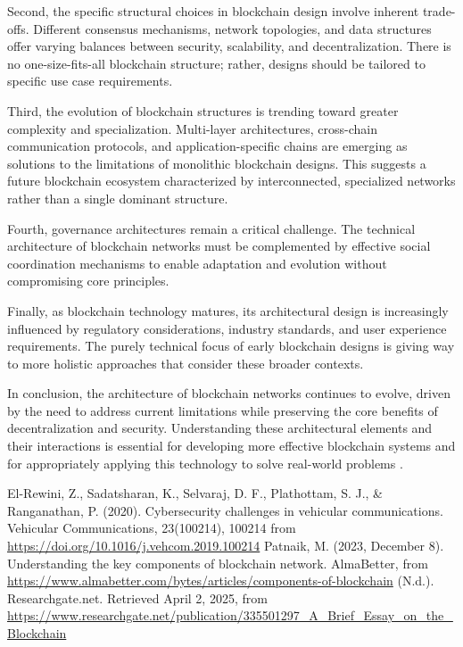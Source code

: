 \documentclass[twoside]{article}
\begin{document}
Second, the specific structural choices in blockchain design involve inherent trade-offs. Different consensus mechanisms, network topologies, and data structures offer varying balances between security, scalability, and decentralization. There is no one-size-fits-all blockchain structure; rather, designs should be tailored to specific use case requirements.

Third, the evolution of blockchain structures is trending toward greater complexity and specialization. Multi-layer architectures, cross-chain communication protocols, and application-specific chains are emerging as solutions to the limitations of monolithic blockchain designs. This suggests a future blockchain ecosystem characterized by interconnected, specialized networks rather than a single dominant structure.

Fourth, governance architectures remain a critical challenge. The technical architecture of blockchain networks must be complemented by effective social coordination mechanisms to enable adaptation and evolution without compromising core principles.

Finally, as blockchain technology matures, its architectural design is increasingly influenced by regulatory considerations, industry standards, and user experience requirements. The purely technical focus of early blockchain designs is giving way to more holistic approaches that consider these broader contexts.

In conclusion, the architecture of blockchain networks continues to evolve, driven by the need to address current limitations while preserving the core benefits of decentralization and security. Understanding these architectural elements and their interactions is essential for developing more effective blockchain systems and for appropriately applying this technology to solve real-world problems \cite{reasearchgate, patnaik, doi}.

\begin{thebibliography}{9}
  El-Rewini, Z., Sadatsharan, K., Selvaraj, D. F., Plathottam, S. J., \& Ranganathan, P. (2020). Cybersecurity challenges in vehicular communications. Vehicular Communications, 23(100214), 100214 from \url{https://doi.org/10.1016/j.vehcom.2019.100214}
  Patnaik, M. (2023, December 8). Understanding the key components of blockchain network. AlmaBetter, from \url{https://www.almabetter.com/bytes/articles/components-of-blockchain}
  (N.d.). Researchgate.net. Retrieved April 2, 2025, from \url{https://www.researchgate.net/publication/335501297_A_Brief_Essay_on_the_Blockchain}
\end{thebibliography}
\end{document}
